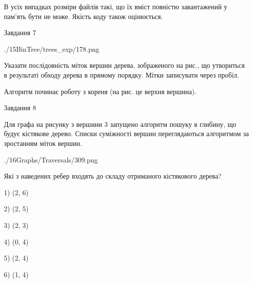 \documentclass[12pt, ukrainian]{article}
\begin{document}
{В усіх випадках розміри файлів такі, що їх вміст повністю завантажений у пам'ять бути не може. Якість коду також оцінюється.



\vspace{10mm}\par

\newpage
\begin{minipage}[t]{9.7cm}
               
{\begin{center}Завдання {7}\end{center}}
\vspace{-6mm}

\begin{center}
	{./15BinTree/trees_exp/178.png}
\end{center}
Указати послідовність міток вершин дерева, зображеного на рис., що утвориться в результаті обходу дерева в прямому порядку. Мітки записувати через пробіл.\par Алгоритм починає роботу з кореня (на рис. це верхня вершина).\par

\end{minipage}
\vline \hspace{8mm}
\begin{minipage}[t]{8.0cm}
               
{\begin{center}Завдання {8}\end{center}}
\vspace{-6mm}
Для графа на рисунку з вершини 3 запущено алгоритм пошуку в глибину, що будує кістякове дерево. Списки суміжності вершин переглядаються алгоритмом за зростанням міток вершин.\par
\begin{center}
	{./16Graphs/Traversals/309.png}
\end{center}
\par Які з наведених ребер входять до складу отриманого кістякового дерева?\par
1) (2, 6)\par
2) (2, 5)\par
3) (2, 3)\par
4) (0, 4)\par
5) (2, 4)\par
6) (1, 4)\par
{\vskip 15pt} \par


\end{minipage}}
\end{document}
